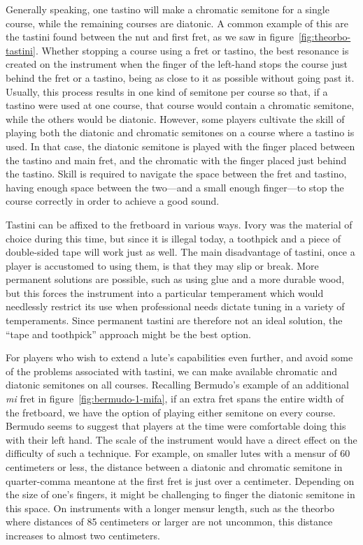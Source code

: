 Generally speaking, one tastino will make a chromatic semitone for a single course, while the remaining courses are
diatonic. A common example of this are the tastini found between the nut and first fret, as we saw in 
figure~\ref{fig:theorbo-tastini}. Whether stopping a course using a fret or tastino, the best resonance is created on
the instrument when the finger of the left-hand stops the course just behind the fret or a tastino, being as close to it
as possible without going past it. Usually, this process results in one kind of semitone per course so that, if a
tastino were used at one course, that course would contain a chromatic semitone, while the others would be diatonic.
However, some players cultivate the skill of playing both the diatonic and chromatic semitones on a course where a
tastino is used. In that case, the diatonic semitone is played with the finger placed between the tastino and main fret,
and the chromatic with the finger placed just behind the tastino. Skill is required to navigate the space between the
fret and tastino, having enough space between the two---and a small enough finger---to stop the course correctly in
order to achieve a good sound.

Tastini can be affixed to the fretboard in various ways. Ivory was the material of choice during this time, but since it
is illegal today, a toothpick and a piece of double-sided tape will work just as well. The main disadvantage of tastini,
once a player is accustomed to using them, is that they may slip or break. More permanent solutions are possible, such
as using glue and a more durable wood, but this forces the instrument into a particular temperament which would
needlessly restrict its use when professional needs dictate tuning in a variety of temperaments. Since permanent tastini
are therefore not an ideal solution, the ``tape and toothpick'' approach might be the best option.

For players who wish to extend a lute's capabilities even further, and avoid some of the problems associated with
tastini, we can make available chromatic and diatonic semitones on all courses. Recalling Bermudo's example of an
additional \textit{mi} fret in figure~\ref{fig:bermudo-1-mifa}, if an extra fret spans the entire width of the
fretboard, we have the option of playing either semitone on every course. Bermudo seems to suggest that players at the
time were comfortable doing this with their left hand. The scale of the instrument would have a direct effect on the
difficulty of such a technique. For example, on smaller lutes with a mensur of 60 centimeters or less, the distance
between a diatonic and chromatic semitone in quarter-comma meantone at the first fret is just over a centimeter.
Depending on the size of one's fingers, it might be challenging to finger the diatonic semitone in this space. On
instruments with a longer mensur length, such as the theorbo where distances of 85 centimeters or larger are not
uncommon, this distance increases to almost two centimeters.


